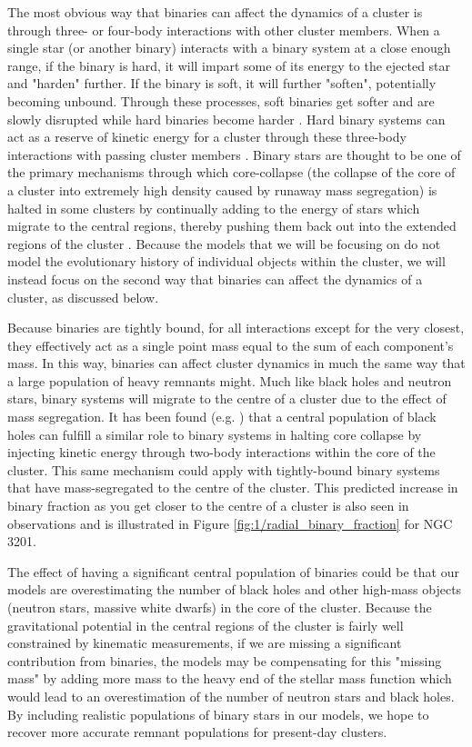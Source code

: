 The most obvious way that binaries can affect the dynamics of a cluster is through three- or
four-body interactions with other cluster members. When a single star (or another binary) interacts
with a binary system at a close enough range, if the binary is hard, it will impart some of its
energy to the ejected star and "harden" further. If the binary is soft, it will further "soften",
potentially becoming unbound. Through these processes, soft binaries get softer and are slowly
disrupted while hard binaries become harder \citep{Heggie1975}. Hard binary systems can act as a
reserve of kinetic energy for a cluster through these three-body interactions with passing cluster
members \citep{Heggie2003}. Binary stars are thought to be one of the primary mechanisms through
which core-collapse (the collapse of the core of a cluster into extremely high density caused by
runaway mass segregation) is halted in some clusters by continually adding to the energy of stars
which migrate to the central regions, thereby pushing them back out into the extended regions of the
cluster \citep{Chatterjee2013}. Because the models that we will be focusing on do not model the
evolutionary history of individual objects within the cluster, we will instead focus on the second
way that binaries can affect the dynamics of a cluster, as discussed below.

Because binaries are tightly bound, for all interactions except for the very closest, they
effectively act as a single point mass equal to the sum of each component's mass. In this way,
binaries can affect cluster dynamics in much the same way that a large population of heavy remnants
might. Much like black holes and neutron stars, binary systems will migrate to the centre of a
cluster due to the effect of mass segregation. It has been found (e.g. \citealt{Kremer2019}) that a
central population of black holes can fulfill a similar role to binary systems in halting core
collapse by injecting kinetic energy through two-body interactions within the core of the cluster.
This same mechanism could apply with tightly-bound binary systems that have mass-segregated to the
centre of the cluster. This predicted increase in binary fraction as you get closer to the centre of
a cluster is also seen in observations and is illustrated in Figure
\ref{fig:1/radial_binary_fraction} for NGC 3201.

The effect of having a significant central population of binaries could be that our models are
overestimating the number of black holes and other high-mass objects (neutron stars, massive white
dwarfs) in the core of the cluster. Because the gravitational potential in the central regions of
the cluster is fairly well constrained by kinematic measurements, if we are missing a significant
contribution from binaries, the models may be compensating for this "missing mass" by adding more
mass to the heavy end of the stellar mass function which would lead to an overestimation of the
number of neutron stars and black holes. By including realistic populations of binary stars in our
models, we hope to recover more accurate remnant populations for present-day clusters.

